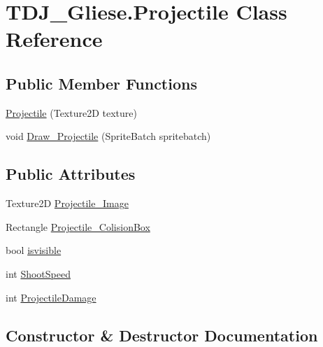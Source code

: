 \hypertarget{class_t_d_j___gliese_1_1_projectile}{}\section{T\+D\+J\+\_\+\+Gliese.\+Projectile Class Reference}
\label{class_t_d_j___gliese_1_1_projectile}
\subsection*{Public Member Functions}
\begin{DoxyCompactItemize}
\item 
\hyperlink{class_t_d_j___gliese_1_1_projectile_a836d7c7156fee64079dad6fe0a313fe9}{Projectile} (Texture2D texture)
\item 
void \hyperlink{class_t_d_j___gliese_1_1_projectile_ad650f132cf8f79674ea4beafb8a62938}{Draw\+\_\+\+Projectile} (Sprite\+Batch spritebatch)
\end{DoxyCompactItemize}
\subsection*{Public Attributes}
\begin{DoxyCompactItemize}
\item 
Texture2D \hyperlink{class_t_d_j___gliese_1_1_projectile_a11ccc3fc13f12c356a855dc14d716204}{Projectile\+\_\+\+Image}
\item 
Rectangle \hyperlink{class_t_d_j___gliese_1_1_projectile_a73e50d3e692c5829e849d7a6d9e2ef25}{Projectile\+\_\+\+Colision\+Box}
\item 
bool \hyperlink{class_t_d_j___gliese_1_1_projectile_a80257c9ac2eb31516f0bfeaa560bfd27}{isvisible}
\item 
int \hyperlink{class_t_d_j___gliese_1_1_projectile_aba7ed8680effd7857fb6ca5ea86fd769}{Shoot\+Speed}
\item 
int \hyperlink{class_t_d_j___gliese_1_1_projectile_a856e754a7b21dff3d22fe4ac77a67ae1}{Projectile\+Damage}
\end{DoxyCompactItemize}


\subsection{Constructor \& Destructor Documentation}
\mbox{\label{class_t_d_j___gliese_1_1_projectile_a836d7c7156fee64079dad6fe0a313fe9}} 
